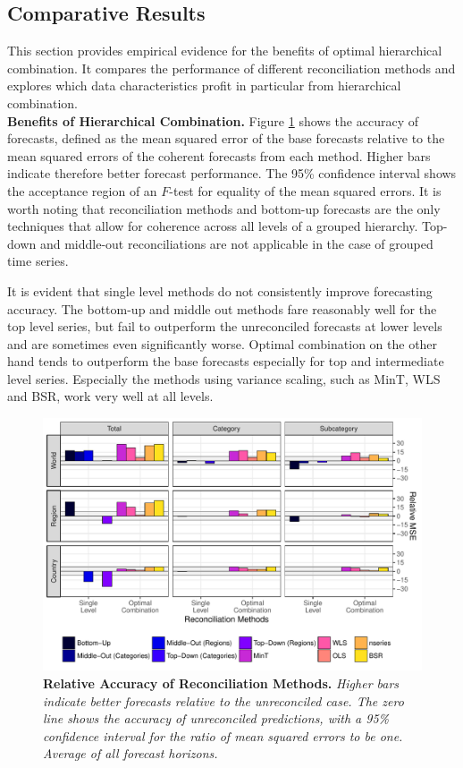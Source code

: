 \documentclass[a4paper,fleqn,11pt]{article}
\begin{document}
\subsection{Comparative Results}
This section provides empirical evidence for the benefits of optimal hierarchical combination. It compares the performance of different reconciliation methods and explores which data characteristics profit in particular from hierarchical combination.\\
 
\noindent\textbf{Benefits of Hierarchical Combination.} Figure \ref{fig:rmse} shows the accuracy of forecasts, defined as the mean squared error of the base forecasts relative to the mean squared errors of the coherent forecasts from each method. Higher bars indicate therefore better forecast performance. The 95\% confidence interval shows the acceptance region of an $F$-test for equality of the mean squared errors. It is worth noting that reconciliation methods and bottom-up forecasts are the only techniques that allow for coherence across all levels of a grouped hierarchy. Top-down and middle-out reconciliations are not applicable in the case of grouped time series.

It is evident that single level methods do not consistently improve forecasting accuracy. The bottom-up and middle out methods fare reasonably well for the top level series, but fail to outperform the unreconciled forecasts at lower levels and are sometimes even significantly worse. Optimal combination on the other hand tends to outperform the base forecasts especially for top and intermediate level series. Especially the methods using variance scaling, such as MinT, WLS and BSR, work very well at all levels.
\begin{figure}[H]
	\includegraphics[width=\textwidth]{fig/fig_eval_rmse_relative}
	\caption[Relative Accuracy of Reconciliation Methods]{\textbf{Relative Accuracy of Reconciliation Methods.} \small{\textit{Higher bars indicate better forecasts relative to the unreconciled case. The zero line shows the accuracy of unreconciled predictions, with a 95\% confidence interval for the ratio of mean squared errors to be one. Average of all forecast horizons.}}} \label{fig:rmse}
\end{figure}
\end{document}
